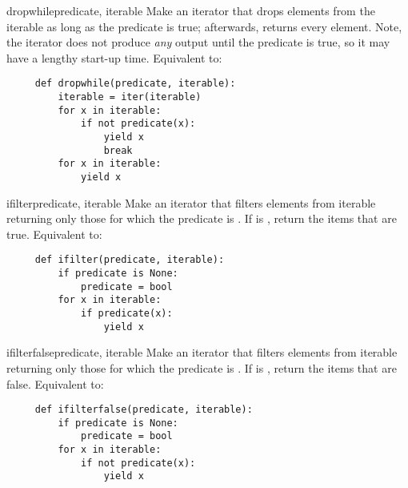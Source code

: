 \begin{funcdesc}{dropwhile}{predicate, iterable}
  Make an iterator that drops elements from the iterable as long as
  the predicate is true; afterwards, returns every element.  Note,
  the iterator does not produce \emph{any} output until the predicate
  is true, so it may have a lengthy start-up time.  Equivalent to:

  \begin{verbatim}
     def dropwhile(predicate, iterable):
         iterable = iter(iterable)
         for x in iterable:
             if not predicate(x):
                 yield x
                 break
         for x in iterable:
             yield x
  \end{verbatim}
\end{funcdesc}

\begin{funcdesc}{ifilter}{predicate, iterable}
  Make an iterator that filters elements from iterable returning only
  those for which the predicate is .
  If  is , return the items that are true.
  Equivalent to:

  \begin{verbatim}
     def ifilter(predicate, iterable):
         if predicate is None:
             predicate = bool
         for x in iterable:
             if predicate(x):
                 yield x
  \end{verbatim}
\end{funcdesc}

\begin{funcdesc}{ifilterfalse}{predicate, iterable}
  Make an iterator that filters elements from iterable returning only
  those for which the predicate is .
  If  is , return the items that are false.
  Equivalent to:

  \begin{verbatim}
     def ifilterfalse(predicate, iterable):
         if predicate is None:
             predicate = bool
         for x in iterable:
             if not predicate(x):
                 yield x
  \end{verbatim}
\end{funcdesc}

